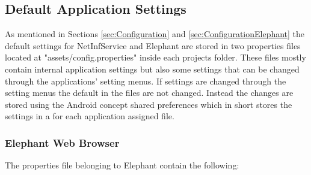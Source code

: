 \subsection{Default Application Settings}

As mentioned in Sections \ref{sec:Configuration} and \ref{sec:ConfigurationElephant} the default settings for NetInfService and Elephant are stored in two properties files located at "assets/config.properties" inside each projects folder. These files mostly contain internal application settings but also some settings that can be changed through the applications' setting menus. If settings are changed through the setting menus the default in the files are not changed. Instead the changes are stored using the Android concept shared preferences which in short stores the settings in a for each application assigned file.

\subsubsection{Elephant Web Browser}
\label{sec:MaintElephantSettings}

The properties file belonging to Elephant contain the following:

